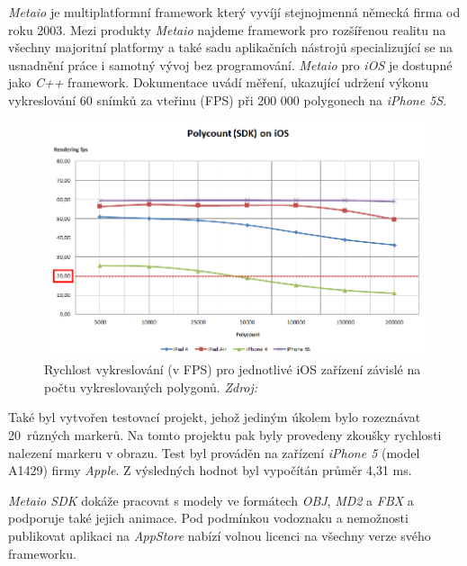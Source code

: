 \documentclass[twoside,12pt]{article}
\begin{document}
\textit{Metaio} je multiplatformní framework který vyvíjí stejnojmenná německá firma od roku 2003. Mezi produkty \textit{Metaio} najdeme framework pro rozšířenou realitu na všechny majoritní platformy a také sadu aplikačních nástrojů specializující se na usnadnění práce i samotný vývoj bez programování. \textit{Metaio} pro \textit{iOS} je dostupné jako \textit{C++} framework. 
Dokumentace uvádí měření, ukazující udržení výkonu vykreslování 60 snímků za vteřinu (FPS) při 200 000 polygonech na \textit{iPhone 5S}.

\begin{figure}[H]
\centering
    \includegraphics[width=424px, center]{images/Polycount_SDK_iOS_20fps.png}
\captionsetup{justification=centering}
    \caption{Rychlost vykreslování (v FPS) pro jednotlivé iOS zařízení závislé na počtu vykreslovaných polygonů. \textit{Zdroj: \cite{metaio_benchmark}}}
    \label{metaio_benchmark}
\end{figure}

Také byl vytvořen testovací projekt, jehož jediným úkolem bylo rozeznávat 20~různých markerů. Na tomto projektu pak byly provedeny zkoušky rychlosti nalezení markeru v obrazu. Test byl prováděn na zařízení \textit{iPhone 5} (model A1429) firmy \textit{Apple}. Z výsledných hodnot byl vypočítán průměr 4,31 ms. 

\textit{Metaio SDK} dokáže pracovat s modely ve formátech \textit{OBJ}, \textit{MD2} a \textit{FBX} a podporuje také jejich animace. Pod podmínkou vodoznaku a nemožnosti publikovat aplikaci na \textit{AppStore} nabízí volnou licenci na všechny verze svého frameworku. 
\end{document}
